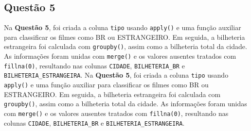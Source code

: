 \documentclass{article}
\begin{document}
\subsection*{Questão 5}
\linespread{1.5}
Na \textbf{Questão 5}, foi criada a coluna \texttt{tipo} usando \texttt{apply()} e uma função auxiliar para classificar os filmes como BR ou ESTRANGEIRO. Em seguida, a bilheteria estrangeira foi calculada com \texttt{groupby()}, assim como a bilheteria total da cidade. As informações foram unidas com \texttt{merge()} e os valores ausentes tratados com \texttt{fillna(0)}, resultando nas colunas \texttt{CIDADE}, \texttt{BILHETERIA\_BR} e \texttt{BILHETERIA\_ESTRANGEIRA}.
Na \textbf{Questão 5}, foi criada a coluna \texttt{tipo} usando \texttt{apply()} e uma função auxiliar para classificar os filmes como BR ou ESTRANGEIRO. Em seguida, a bilheteria estrangeira foi calculada com \texttt{groupby()}, assim como a bilheteria total da cidade. As informações foram unidas com \texttt{merge()} e os valores ausentes tratados com \texttt{fillna(0)}, resultando nas colunas \texttt{CIDADE}, \texttt{BILHETERIA\_BR} e \texttt{BILHETERIA\_ESTRANGEIRA}.
\linespread{1}
\end{document}
